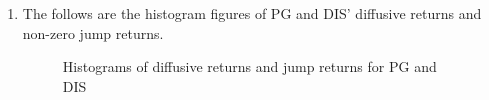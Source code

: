 \documentclass[12pt,letterpaper]{article}
\begin{document}
\begin{enumerate}[label=\textbf{(\Alph*)}]
   
\item The follows are the histogram figures of PG and DIS' diffusive returns and non-zero jump returns.
\begin{figure}[H]
            \centering
            \caption{Histograms of diffusive returns and jump returns for PG and DIS}
\end{figure}


\end{enumerate}
\end{document}

